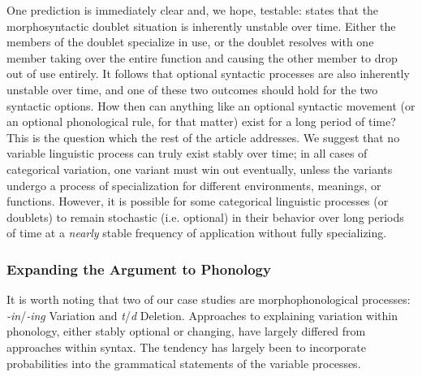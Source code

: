 One prediction is immediately clear and, we hope, testable: \citet{kroch1989,kroch1994} states that the morphosyntactic doublet situation is inherently unstable over time.
Either the members of the doublet specialize in use, or the doublet resolves with one member taking over the entire function and causing the other member to drop out of use entirely.
It follows that optional syntactic processes are also inherently unstable over time, and one of these two outcomes should hold for the two syntactic options.
How then can anything like an optional syntactic movement (or an optional phonological rule, for that matter) exist for a long period of time? This is the question which the rest of the article addresses.
We suggest that no variable linguistic process can truly exist stably over time; in all cases of categorical variation, one variant must win out eventually, unless the variants undergo a process of specialization for different environments, meanings, or functions.
However, it is possible for some categorical linguistic processes (or doublets) to remain stochastic (i.e. optional) in their behavior over long periods of time at a \textsl{nearly} stable frequency of application without fully specializing. 



\subsubsection{Expanding the Argument to Phonology}
It is worth noting that two of our case studies are morphophonological processes: {\sl -in}/{\sl -ing} Variation and {\sl t}/{\sl d} Deletion.
Approaches to explaining variation within phonology, either stably optional or changing, have largely differed from approaches within syntax.
The tendency has largely been to incorporate probabilities into the grammatical statements of the variable processes.

